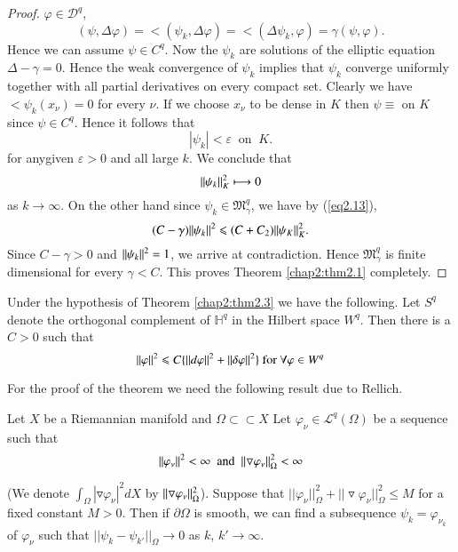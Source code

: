 \begin{proof}
  $\varphi \in \mathscr{D}^q$, 
  $$
  (\psi, \Delta \varphi)= \lt (\psi_k,\Delta \varphi)= \lt
  (\Delta \psi_k, \varphi) =\gamma(\psi ,\varphi).
  $$ 
  Hence we can assume $\psi \in C^q$. Now the $\psi_k$ are solutions
  of the elliptic  equation $\Delta-\gamma=0$. Hence the weak
  convergence of $\psi_k$ implies 
  that $\psi_k$ converge uniformly together with all partial derivatives
  on every compact set. Clearly we have $\lt \psi_k(x_{\nu})=0$ for every $\nu$.
  If we choose $x_{\nu}$ to be dense in $K$ then $\psi \equiv$ on $K$ since
  $\psi \in C^q$. Hence it follows that
  $$
  |\psi_k|<  \varepsilon ~\text{ on }~ K.
  $$
  for any\pageoriginale given $\varepsilon  >0$ and all large $k$. We
  conclude that 
  $$
\Arrowvert \psi_k \Arrowvert^2_K \longmapsto 0
$$
  as $k\to \infty$. On the other hand since $\psi_k \in
  \mathfrak{M}^q_{\gamma}$, we have by (\ref{eq2.13}), 
  $$ 
  (C-\gamma) \Arrowvert \psi_k \Arrowvert^2 \leqslant (C +C_2)
  \Arrowvert \psi_K \Arrowvert^2_K.
  $$ 
  Since $C-\gamma>0$ and $\Arrowvert \psi_k \Arrowvert^2=1$, we arrive
  at contradiction. Hence $\mathfrak{M}^q_{\gamma}$ is finite dimensional
  for every $\gamma < C$. This proves Theorem \ref{chap2:thm2.1} completely.
\end{proof}

\begin{theorem}\label{chap2:thm2.4}%
  Under the hypothesis of Theorem \ref{chap2:thm2.3} we have the following. 
Let $S^q$ denote the orthogonal complement of $ \mathbb{H}^q$ in the
Hilbert space $W^q$. Then there is a $C>0$ such that
$$ 
\Arrowvert \varphi \Arrowvert^2 \leqslant C \{\Arrowvert d \varphi
\Arrowvert^2 + \Arrowvert \delta \varphi \Arrowvert^2 \} ~\text{for}~
\forall \varphi \in W^q 
$$

 For the proof of the theorem we need the following result 
due to Rellich.
\end{theorem}

\begin{lemma}\label{chap2:lem2.6}%
  Let $X$ be a Riemannian manifold and $\Omega \subset \subset X$
Let $\varphi_{\nu}\in \mathcal{L}^q(\Omega)$ be a sequence such that 
$$
\Arrowvert \varphi_{\nu} \Arrowvert^2 < \infty  ~ \text{ and } ~ \Arrowvert
\triangledown \varphi_{\nu} \Arrowvert^2_{\Omega}< \infty
$$
\end{lemma}

(We denote $\int_{\Omega}|\triangledown \varphi_{\nu}|^2 dX$ by
$\Arrowvert \triangledown
\varphi_{\nu}\Arrowvert^2_{\Omega}$). Suppose that 
$ || \varphi_{\nu} ||^2_{\Omega}+|| \triangledown
\varphi_{\nu}||^2_{\Omega} \leqslant {M}$ for a fixed constant
$M>0$. Then if $\partial \Omega$ is smooth, we can find a subsequence
$\psi_k =\varphi_{\nu_k}$ of $\varphi_{\nu}$ 
such that $||\psi_k -\psi_{k'}||_{\Omega} \to 0$ as $k$, $k' \to \infty$.

